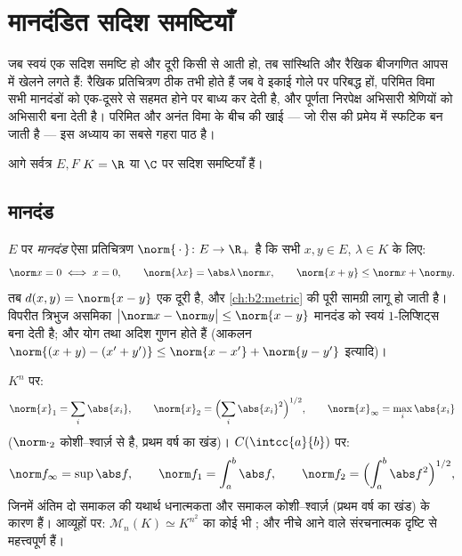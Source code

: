 \chapter{मानदंडित सदिश समष्टियाँ}\label{ch:b2:nvs}

जब  स्वयं एक सदिश समष्टि हो और दूरी किसी  से आती हो,
तब सांस्थिति और रैखिक बीजगणित आपस में खेलने लगते हैं: रैखिक प्रतिचित्रण
ठीक तभी  होते हैं जब वे इकाई गोले पर परिबद्ध हों, परिमित विमा सभी
मानदंडों को एक-दूसरे से सहमत होने पर बाध्य कर देती है, और पूर्णता
निरपेक्ष अभिसारी श्रेणियों को अभिसारी बना देती है। परिमित और अनंत विमा
के बीच की खाई --- जो रीस की प्रमेय में स्फटिक बन जाती है --- इस अध्याय
का सबसे गहरा पाठ है।

आगे सर्वत्र $E, F$ $K = \R$ या $\C$ पर सदिश समष्टियाँ हैं।

\section{मानदंड}

\begin{definition}\label{def:b2:nvs:norm}
$E$ पर \emph{मानदंड} ऐसा प्रतिचित्रण $\norm{\,\cdot\,} \colon E
\to \R_+$ है कि सभी $x, y \in E$,
$\lambda \in K$ के लिए:
\[
\norm x = 0 \iff x = 0,
\qquad
\norm{\lambda x} = \abs\lambda\,\norm x,
\qquad
\norm{x + y} \leq \norm x + \norm y .
\]
तब $d(x, y) = \norm{x - y}$ एक दूरी है, और \cref{ch:b2:metric} की पूरी सामग्री लागू हो जाती है। विपरीत
त्रिभुज असमिका $\bigl|\norm x - \norm y\bigr| \leq \norm{x - y}$ मानदंड को स्वयं $1$-लिप्शिट्स बना देती है; और योग
तथा अदिश गुणन  होते हैं (आकलन $\norm{(x + y) - (x' + y')} \leq \norm{x -
x'} + \norm{y - y'}$ इत्यादि)।
\end{definition}

\begin{example}\label{ex:b2:nvs:examples}
$K^n$ पर:
\[
\norm{x}_1 = \sum_i \abs{x_i},
\qquad
\norm{x}_2 = \Bigl(\sum_i \abs{x_i}^2\Bigr)^{1/2},
\qquad
\norm{x}_\infty = \max_i \abs{x_i}
\]
($\norm\cdot_2$ कोशी--श्वार्ज़ से  है, प्रथम वर्ष का खंड)। $C(\intcc{a}{b})$ पर:
\[
\norm f_\infty = \sup \abs f,
\qquad
\norm f_1 = \int_a^b \abs f,
\qquad
\norm f_2 = \Bigl(\int_a^b \abs f^2\Bigr)^{1/2},
\]
जिनमें अंतिम दो समाकल की यथार्थ धनात्मकता और समाकल कोशी--श्वार्ज़ (प्रथम
वर्ष का खंड) के कारण  हैं। आव्यूहों पर: $\mathcal M_n(K) \simeq K^{n^2}$ का कोई भी ;
और नीचे आने वाले  संरचनात्मक दृष्टि से महत्त्वपूर्ण हैं।
\end{example}

